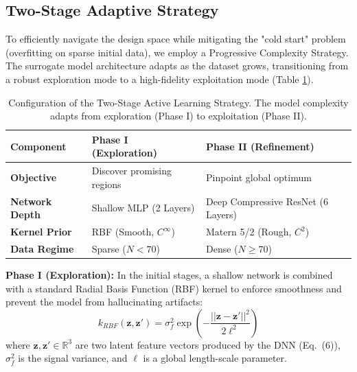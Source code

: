 \documentclass[
  preprint,
  12pt,
  a4paper
]{elsarticle}
\newcommand{\new}[1]{#1}
\begin{document}
\subsection{Two-Stage Adaptive Strategy}
\label{sec:two_stage}
To efficiently navigate the design space while mitigating the "cold start" problem (overfitting on sparse initial data), we employ a Progressive Complexity Strategy. The surrogate model architecture adapts as the dataset grows, transitioning from a robust exploration mode to a high-fidelity exploitation mode (Table \ref{tab:phases}).

\begin{table}[htbp]
    \centering
    \caption{Configuration of the Two-Stage Active Learning Strategy. The model complexity adapts from exploration (Phase I) to exploitation (Phase II).}
    \label{tab:phases}
    \begin{tabular}{l l l}
        \toprule
        \textbf{Component} & \textbf{Phase I (Exploration)} & \textbf{Phase II (Refinement)} \\
        \midrule
        \textbf{Objective} & Discover promising regions & Pinpoint global optimum \\
        \textbf{Network Depth} & Shallow MLP (2 Layers) & Deep Compressive ResNet (6 Layers) \\
        \textbf{Kernel Prior} & RBF (Smooth, $C^\infty$) & Matern 5/2 (Rough, $C^2$) \\
        \textbf{Data Regime} & Sparse ($N < 70$) & Dense ($N \geq 70$) \\
        \bottomrule
    \end{tabular}
\end{table}

\textbf{Phase I (Exploration):} In the initial stages, a shallow network is combined with a standard Radial Basis Function (RBF) kernel to enforce smoothness and prevent the model from hallucinating artifacts:
\begin{equation}
    k_{RBF}(\mathbf{z}, \mathbf{z}') = \sigma_f^2 \exp\left( - \frac{||\mathbf{z} - \mathbf{z}'||^2}{2\ell^2} \right)
\end{equation}
where \new{$\mathbf{z}, \mathbf{z}' \in \mathbb{R}^3$ are two latent feature vectors produced by the DNN (Eq.~(6)), $\sigma_f^2$ is the signal variance, and} $\ell$ is a global length-scale parameter.
\end{document}
